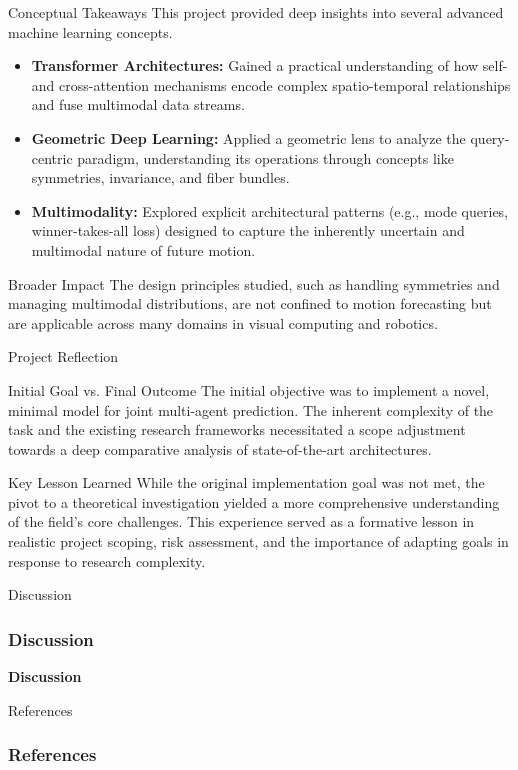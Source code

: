 \documentclass[10pt,aspectratio=169]{beamer}
\begin{document}
\begin{frame}{Conceptual Takeaways}
    This project provided deep insights into several advanced machine learning concepts.
    \begin{itemize}
        \item \textbf{Transformer Architectures:} Gained a practical understanding of how self- and cross-attention mechanisms encode complex spatio-temporal relationships and fuse multimodal data streams.
        \item \textbf{Geometric Deep Learning:} Applied a geometric lens to analyze the query-centric paradigm, understanding its operations through concepts like symmetries, invariance, and fiber bundles.
        \item \textbf{Multimodality:} Explored explicit architectural patterns (e.g., mode queries, winner-takes-all loss) designed to capture the inherently uncertain and multimodal nature of future motion.
    \end{itemize}
    \begin{block}{Broader Impact}
        The design principles studied, such as handling symmetries and managing multimodal distributions, are not confined to motion forecasting but are applicable across many domains in visual computing and robotics.
    \end{block}
\end{frame}

\begin{frame}{Project Reflection}
    \begin{block}{Initial Goal vs. Final Outcome}
        The initial objective was to implement a novel, minimal model for joint multi-agent prediction. The inherent complexity of the task and the existing research frameworks necessitated a scope adjustment towards a deep comparative analysis of state-of-the-art architectures.
    \end{block}

    \begin{alertblock}{Key Lesson Learned}
        While the original implementation goal was not met, the pivot to a theoretical investigation yielded a more comprehensive understanding of the field's core challenges. This experience served as a formative lesson in realistic project scoping, risk assessment, and the importance of adapting goals in response to research complexity.
    \end{alertblock}
\end{frame}

\begin{frame}{Discussion}
    \frametitle{Discussion}
    \begin{center}
        {\LARGE\bfseries Discussion}
    \end{center}
\end{frame}

\begin{frame}[allowframebreaks]{References}
  \frametitle{References}
  
  
\end{frame}
\end{document}
